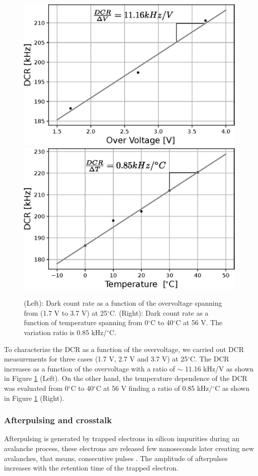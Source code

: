 \documentclass[a4paper,11pt]{article}
\begin{document}
\begin{figure}[htbp]
\centering 
\includegraphics[width=.48\textwidth]{Figures/DCR_vs_ov_1350CS.eps}
\quad
\includegraphics[width=.48\textwidth]{Figures/DCR_T_1350CS.eps}
\caption{\label{fig:DCRover} (Left): Dark count rate as a function of the overvoltage spanning from (1.7 V to 3.7 V) at 25$^{\circ}$C. (Right): Dark count rate as a function of temperature spanning from 0$^{\circ}$C to 40$^{\circ}$C at 56 V. The variation ratio is 0.85 kHz/$^{\circ}$C.}
\end{figure}

To characterize the DCR as a function of the overvoltage, we carried out DCR measurements for three cases (1.7 V, 2.7 V and 3.7 V) at 25$^{\circ}$C. The DCR increases as a function of the overvoltage with a ratio of $\sim$ 11.16 kHz/V as shown in Figure \ref{fig:DCRover} (Left). On the other hand, the temperature dependence of the DCR was evaluated from 0$^{\circ}$C to 40$^{\circ}$C at 56 V finding a ratio of 0.85 kHz/$^{\circ}$C as shown in Figure \ref{fig:DCRover} (Right).



\subsubsection{Afterpulsing and crosstalk}

Afterpulsing is generated by trapped electrons in silicon impurities during an avalanche process, these electrons are released few nanoseconds later creating new avalanches, that means, consecutive pulses \cite{Xu2017}. The amplitude of afterpulses increases with the retention time of the trapped electron. 
\end{document}
